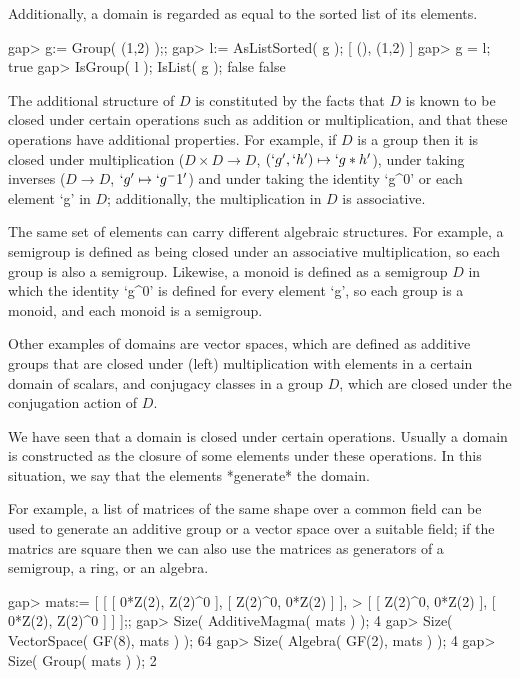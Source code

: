 Additionally, a domain is regarded as equal to the sorted list
of its elements.

\beginexample
    gap> g:= Group( (1,2) );;
    gap> l:= AsListSorted( g );
    [ (), (1,2) ]
    gap> g = l;
    true
    gap> IsGroup( l ); IsList( g );
    false
    false
\endexample



The additional structure of $D$ is constituted by the facts that $D$ is
known to be closed under certain operations such as addition or
multiplication, and that these operations have additional properties.
For example, if $D$ is a group then it is closed under multiplication
($D \times D \rightarrow D$, $(`g',`h') \mapsto `g * h'$),
under taking inverses ($D \rightarrow D$, $`g' \mapsto `g^-1'$)
and under taking the identity `g^0' or each element `g' in $D$;
additionally, the multiplication in $D$ is associative.

The same set of elements can carry different algebraic structures.
For example, a semigroup is defined as being closed under an associative
multiplication, so each group is also a semigroup.
Likewise, a monoid is defined as a semigroup $D$ in which the identity
`g^0' is defined for every element `g', so each group is a monoid,
and each monoid is a semigroup.

Other examples of domains are vector spaces, which are defined as
additive groups that are closed under (left) multiplication with elements
in a certain domain of scalars,
and conjugacy classes in a group $D$,
which are closed under the conjugation action of $D$.



We have seen that a domain is closed under certain operations.
Usually a domain is constructed as the closure of some elements under
these operations.
In this situation, we say that the elements *generate* the domain.

For example, a list of matrices of the same shape over a common field can
be used to generate an additive group or a vector space over a suitable
field; 
if the matrics are square then we can also use the matrices as generators
of a semigroup, a ring, or an algebra.

\beginexample
    gap> mats:= [ [ [ 0*Z(2), Z(2)^0 ], [ Z(2)^0, 0*Z(2) ] ], 
    >             [ [ Z(2)^0, 0*Z(2) ], [ 0*Z(2), Z(2)^0 ] ] ];;
    gap> Size( AdditiveMagma( mats ) );
    4
    gap> Size( VectorSpace( GF(8), mats ) );
    64
    gap> Size( Algebra( GF(2), mats ) );    
    4
    gap> Size( Group( mats ) );         
    2
\endexample

